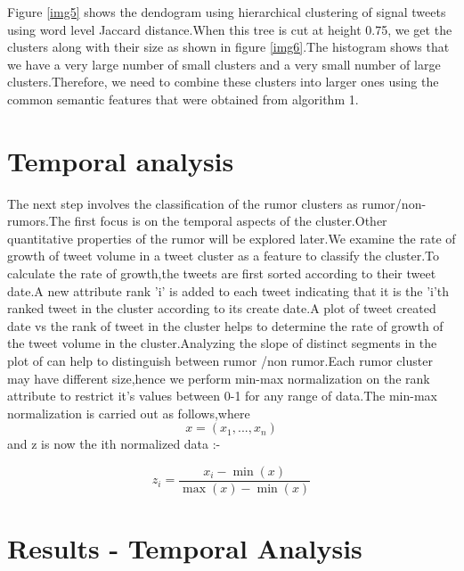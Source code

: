 	 
	 Figure \ref{img5} shows the dendogram using hierarchical clustering of signal tweets using word level Jaccard distance.When this tree is cut at height 0.75, we get the clusters along with their size as shown in figure \ref{img6}.The histogram shows that we have a very large number of small clusters and a very small number of large clusters.Therefore, we need to combine these clusters into larger ones using the common semantic features that were obtained from algorithm 1.
	 
	 \section {Temporal analysis}
	 The next step involves the classification of the rumor clusters as rumor/non-rumors.The first focus is on the temporal aspects of the cluster.Other quantitative properties of the rumor will be explored later.We examine the rate of growth of tweet volume in a tweet cluster as a feature to classify the cluster.To calculate the rate of growth,the tweets are first sorted according to their tweet date.A new attribute rank 'i' is added to each tweet indicating that it is the 'i'th ranked tweet in the cluster according to its create date.A plot of tweet created date vs the rank of tweet in the cluster helps to determine the rate of growth of the tweet volume in the cluster.Analyzing the slope of distinct segments in the plot of can help to distinguish between rumor /non rumor.Each rumor cluster may have different size,hence we perform min-max normalization on the rank attribute to restrict it's values between 0-1 for any range of data.The min-max normalization is carried out as follows,where \begin{equation} x=(x_1,...,x_n) \end{equation} and z is now the ith normalized data :-
	 
	 \begin{equation}
	 z_i=\frac{x_i-\min(x)}{\max(x)-\min(x)}
	 \end{equation}

 \section{Results - Temporal Analysis }
 
